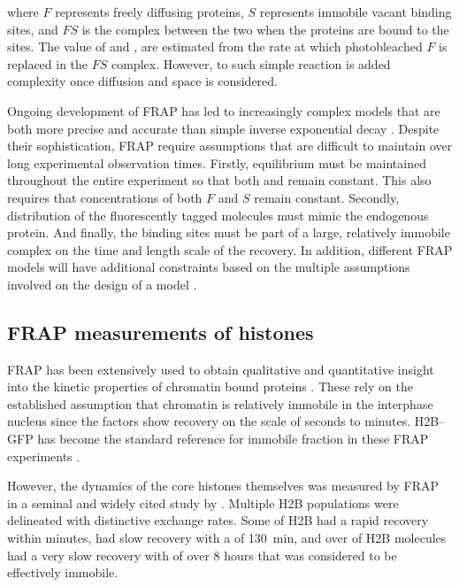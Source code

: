     where $F$ represents freely diffusing proteins,
    $S$ represents immobile vacant binding sites,
    and $FS$ is the complex between the two when the
    proteins are bound to the sites.
    The value of \Kon{} and \Koff{},
    are estimated from the rate at which photobleached $F$
    is replaced in the $FS$ complex.
    However, to such simple reaction is added complexity once
    diffusion and space is considered.

    Ongoing development of FRAP has led to increasingly complex models
    that are both more precise and accurate than simple
    inverse exponential decay \citep{mcnally-frap-2010}.
    Despite their sophistication, FRAP require assumptions
    that are difficult to maintain over long experimental observation times.
    Firstly, equilibrium must be maintained throughout the entire experiment
    so that both \Kon{} and \Koff{} remain constant.
    This also requires that concentrations of both $F$ and $S$ remain constant.
    Secondly, distribution of the fluorescently tagged molecules
    must mimic the endogenous protein.
    And finally, the binding sites must be part of a large,
    relatively immobile complex
    on the time and length scale of the recovery.
    In addition, different FRAP models will have additional constraints
    based on the multiple assumptions involved on the design of a
    model \citep{mcnally-frap-2010}.

  \subsection{FRAP measurements of histones}

    FRAP has been extensively used to obtain qualitative and
    quantitative insight into the kinetic properties of chromatin bound
    proteins \citep{phair2000high, essers2005nuclear, agresti2005gr}.
    These rely on the established assumption that chromatin is
    relatively immobile in the interphase nucleus
    \citep{abney1997chromatin} since the factors show recovery
    on the scale of seconds to minutes.
    H2B--GFP \citep{KevinH2BGFP} has become
    the standard reference for immobile fraction in these
    FRAP experiments \citep{dey2000bromodomain, kuipers2011highly,
    jullien2016chromatibody}.

    However, the dynamics of the core histones themselves
    was measured by FRAP in a seminal
    and widely cited study by \citet{KimuraCook}. Multiple H2B
    populations were delineated with distinctive exchange rates.  Some
     of H2B had a rapid recovery within minutes, 
    had slow recovery with a \halflife[] of \SI{130}{\minute},
    and over  of H2B molecules had a
    very slow recovery with \halflife[] of
    over 8 hours that was considered to be effectively immobile.

